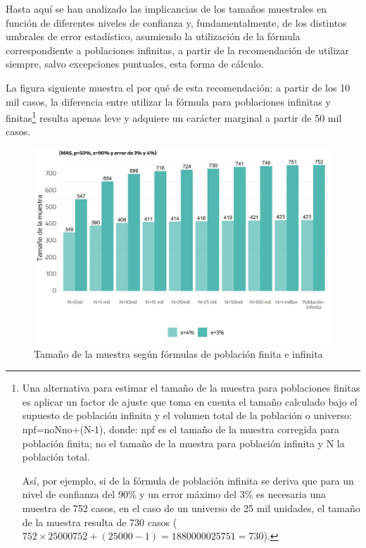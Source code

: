 \documentclass[
]{book}
\begin{document}
Hasta aquí se han analizado las implicancias de los tamaños muestrales en función de diferentes niveles de confianza y, fundamentalmente, de los distintos umbrales de error estadístico, asumiendo la utilización de la fórmula correspondiente a poblaciones infinitas, a partir de la recomendación de utilizar siempre, salvo excepciones puntuales, esta forma de cálculo.

La figura siguiente muestra el por qué de esta recomendación: a partir de los 10 mil casos, la diferencia entre utilizar la fórmula para poblaciones infinitas y finitas\footnote{Una alternativa para estimar el tamaño de la muestra para poblaciones finitas es aplicar un factor de ajuste que toma en cuenta el tamaño calculado bajo el supuesto de población infinita y el volumen total de la población o universo: npf=noNno+(N-1), donde: npf es el tamaño de la muestra corregida para población finita; no el tamaño de la muestra para población infinita y N la población total.

  Así, por ejemplo, si de la fórmula de población infinita se deriva que para un nivel de confianza del 90\% y un error máximo del 3\% es necesaria una muestra de 752 casos, en el caso de un universo de 25 mil unidades, el tamaño de la muestra resulta de 730 casos (\(752×25000752+(25000-1)=1880000025751=730\)).} resulta apenas leve y adquiere un carácter marginal a partir de 50 mil casos.

\begin{figure}

{\centering \includegraphics[width=1\linewidth]{imagenes/DT4_grafico5} 

}

\caption{Tamaño de la muestra según fórmulas de población finita e infinita}\label{fig:Tamañodemuestra}
\end{figure}
\end{document}
